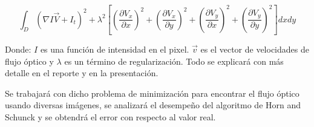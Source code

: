 \documentclass[12pt]{article}
\begin{document}
$$\int_{D}(\nabla I \vec{V} + I_t)^2 + \lambda ^2[(\frac{\partial V_x}{\partial x})^2 + (\frac{\partial V_x}{\partial y})^2 + (\frac{\partial V_y}{\partial x})^2 + (\frac{\partial V_y}{\partial y})^2] dxdy$$

Donde: $I$ es una función de intensidad en el pixel. $\vec{v}$ es el vector de velocidades de flujo óptico y $\lambda$ es un término de regularización. Todo se explicará con más detalle en el reporte y en la presentación.

Se trabajará con dicho problema de minimización para encontrar el flujo óptico usando diversas imágenes, se analizará el desempeño del algoritmo de Horn and Schunck y se obtendrá el error con respecto al valor real.
\end{document}
